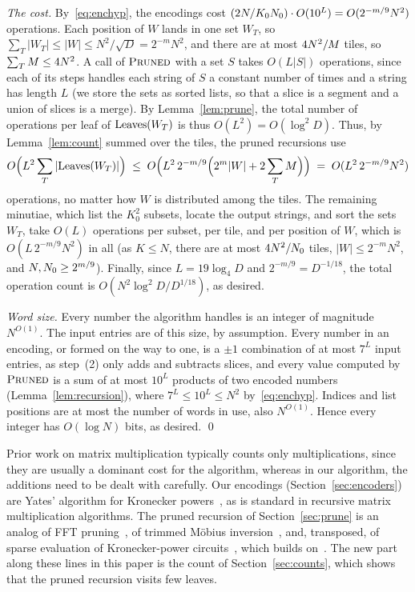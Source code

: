 \emph{The cost.} By~\eqref{eq:enchyp}, the encodings cost $(2N/K_0N_0)\cdot O(10^L)=O(2^{-m/9}N^2)$ operations. Each position of $W$ lands in one set $W_T$, so $\sum_T|W_T|\le|W|\le N^2/\sqrt D=2^{-m}N^2$, and there are at most $4N^2/M$ tiles, so $\sum_TM\le4N^2$. A call of $\textnormal{\textsc{Pruned}}$ with a set $S$ takes $O(L|S|)$ operations, since each of its steps handles each string of $S$ a constant number of times and a string has length $L$ (we store the sets as sorted lists, so that a slice is a segment and a union of slices is a merge). By Lemma~\ref{lem:prune}, the total number of operations per leaf of $\mathrm{Leaves}(W_T)$ is thus $O(L^2)=O(\log^2\!D)$. Thus, by Lemma~\ref{lem:count} summed over the tiles, the pruned recursions use
\[
O\Big(L^2\sum_T|\mathrm{Leaves}(W_T)|\Big)\;\le\;O\Big(L^2\,2^{-m/9}\Big(2^m|W|+2\sum_TM\Big)\Big)\;=\;O(L^2\,2^{-m/9}N^2)
\]
operations, no matter how $W$ is distributed among the tiles. The remaining minutiae, which list the $K_0^2$ subsets, locate the output strings, and sort the sets $W_T$, take $O(L)$ operations per subset, per tile, and per position of $W$, which is $O(L\,2^{-m/9}N^2)$ in all (as $K\le N$, there are at most $4N^2/N_0$ tiles, $|W|\le2^{-m}N^2$, and $N,N_0\ge2^{m/9}$). Finally, since $L=19\log_4D$ and $2^{-m/9}=D^{-1/18}$, the total operation count is $O(N^2\log^2\!D/D^{1/18})$, as desired.

\emph{Word size.} Every number the algorithm handles is an integer of magnitude $N^{O(1)}$. The input entries are of this size, by assumption. Every number in an encoding, or formed on the way to one, is a $\pm1$ combination of at most $7^L$ input entries, as step~(2) only adds and subtracts slices, and every value computed by $\textnormal{\textsc{Pruned}}$ is a sum of at most $10^L$ products of two encoded numbers (Lemma~\ref{lem:recursion}), where $7^L\le10^L\le N^2$ by~\eqref{eq:enchyp}. Indices and list positions are at most the number of words in use, also $N^{O(1)}$. Hence every integer has $O(\log N)$ bits, as desired. \qed

\begin{remark}
Prior work on matrix multiplication typically counts only multiplications, since they are usually a dominant cost for the algorithm, whereas in our algorithm, the additions need to be dealt with carefully. Our encodings (Section~\ref{sec:encoders}) are Yates' algorithm for Kronecker powers~\cite{Yat37,Goo58}, as is standard in recursive matrix multiplication algorithms. The pruned recursion of Section~\ref{sec:prune} is an analog of FFT pruning~\cite{Mar71,SB93}, of trimmed M\"obius inversion~\cite{BHKK10}, and, transposed, of sparse evaluation of Kronecker-power circuits~\cite{AL25}, which builds on~\cite{Wil24}. The new part along these lines in this paper is the count of Section~\ref{sec:counts}, which shows that the pruned recursion visits few leaves.
\end{remark}
